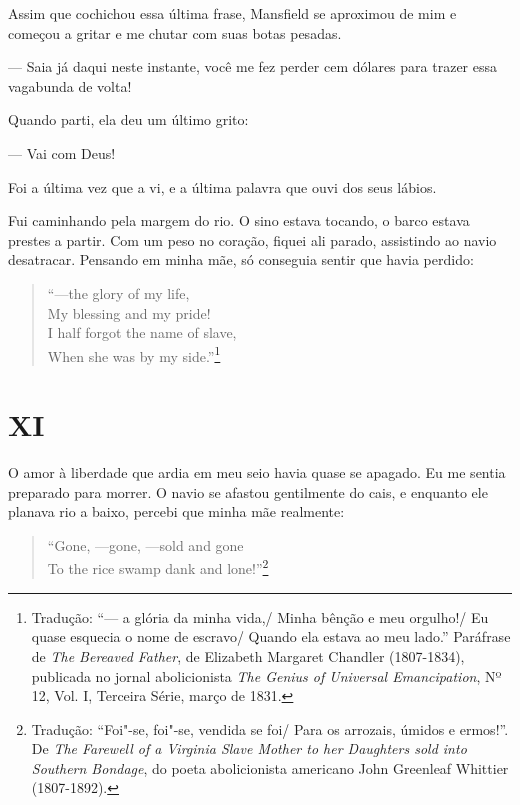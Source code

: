 Assim que cochichou essa última frase, Mansfield se aproximou de mim e
começou a gritar e me chutar com suas botas pesadas.

--- Saia já daqui neste instante, você me fez perder cem dólares para
trazer essa vagabunda de volta!

Quando parti, ela deu um último grito:

--- Vai com Deus!

Foi a última vez que a vi, e a última palavra que ouvi dos seus lábios.

Fui caminhando pela margem do rio. O sino estava tocando, o barco estava
prestes a partir. Com um peso no coração, fiquei ali parado, assistindo
ao navio desatracar. Pensando em minha mãe, só conseguia sentir que
havia perdido:

\begin{verse}
``---the glory of my life,\\
My blessing and my pride!\\
I half forgot the name of slave,\\
When she was by my side.''\footnote{Tradução: ``--- a glória da minha vida,/ Minha bênção e meu orgulho!/ Eu quase esquecia o nome de escravo/ Quando ela estava ao meu lado.'' Paráfrase de \emph{The Bereaved Father}, de Elizabeth
  Margaret Chandler (1807-1834), publicada no jornal abolicionista
  \emph{The Genius of Universal Emancipation}, Nº 12, Vol. I, Terceira
  Série, março de 1831.}
\end{verse}

\chapter{XI}

O amor à liberdade que ardia em meu seio havia quase se apagado. Eu me
sentia preparado para morrer. O navio se afastou gentilmente do cais, e
enquanto ele planava rio a baixo, percebi que minha mãe realmente: %

\begin{verse}
``Gone, ---gone, ---sold and gone\\
To the rice swamp dank and lone!''\footnote{Tradução: ``Foi"-se, foi"-se, vendida se foi/ Para os arrozais, úmidos e ermos!''. De \emph{The Farewell of a Virginia Slave Mother to
  her Daughters sold into Southern Bondage}, do poeta abolicionista
  americano John Greenleaf Whittier (1807-1892).}
\end{verse}

 

